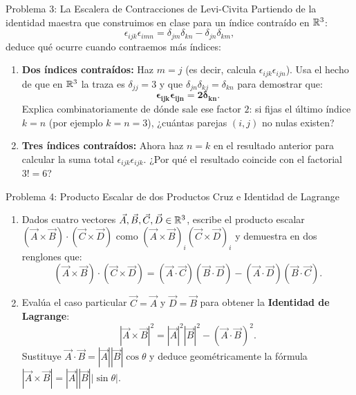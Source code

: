 \documentclass[11pt,letterpaper]{article}
\begin{document}

\begin{infobox}{Problema 3: La Escalera de Contracciones de Levi-Civita}
Partiendo de la identidad maestra que construimos en clase para un índice contraído en $\mathbb{R}^3$:
\[
\epsilon_{ijk}\epsilon_{imn} = \delta_{jm}\delta_{kn} - \delta_{jn}\delta_{km},
\]
deduce qué ocurre cuando contraemos más índices:
\begin{enumerate}[label=(\alph*)]
    \item \textbf{Dos índices contraídos:} Haz $m = j$ (es decir, calcula $\epsilon_{ijk}\epsilon_{ijn}$). Usa el hecho de que en $\mathbb{R}^3$ la traza es $\delta_{jj} = 3$ y que $\delta_{jn}\delta_{kj} = \delta_{kn}$ para demostrar que:
    \[
    \mathbf{\epsilon_{ijk}\epsilon_{ijn} = 2\delta_{kn}}.
    \]
    Explica combinatoriamente de dónde sale ese factor $2$: si fijas el último índice $k=n$ (por ejemplo $k=n=3$), ¿cuántas parejas $(i,j)$ no nulas existen?
    \item \textbf{Tres índices contraídos:} Ahora haz $n = k$ en el resultado anterior para calcular la suma total $\epsilon_{ijk}\epsilon_{ijk}$. ¿Por qué el resultado coincide con el factorial $3! = 6$?
\end{enumerate}
\end{infobox}

\begin{infobox}{Problema 4: Producto Escalar de dos Productos Cruz e Identidad de Lagrange}
\begin{enumerate}[label=(\alph*)]
    \item Dados cuatro vectores $\vec{A}, \vec{B}, \vec{C}, \vec{D} \in \mathbb{R}^3$, escribe el producto escalar $(\vec{A}\times\vec{B})\cdot(\vec{C}\times\vec{D})$ como $(\vec{A}\times\vec{B})_i (\vec{C}\times\vec{D})_i$ y demuestra en dos renglones que:
    \[
    (\vec{A} \times \vec{B}) \cdot (\vec{C} \times \vec{D}) = (\vec{A}\cdot\vec{C})(\vec{B}\cdot\vec{D}) - (\vec{A}\cdot\vec{D})(\vec{B}\cdot\vec{C}).
    \]
    \item Evalúa el caso particular $\vec{C} = \vec{A}$ y $\vec{D} = \vec{B}$ para obtener la \textbf{Identidad de Lagrange}:
    \[
    |\vec{A} \times \vec{B}|^2 = |\vec{A}|^2|\vec{B}|^2 - (\vec{A}\cdot\vec{B})^2.
    \]
    Sustituye $\vec{A}\cdot\vec{B} = |\vec{A}||\vec{B}|\cos\theta$ y deduce geométricamente la fórmula $|\vec{A}\times\vec{B}| = |\vec{A}||\vec{B}||\sin\theta|$.
\end{enumerate}
\end{infobox}
\end{document}
